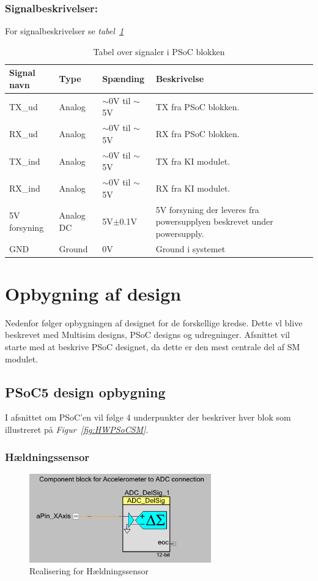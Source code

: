\subsubsection{Signalbeskrivelser:}
For signalbeskrivelser se \textit{tabel~\ref{table:UARTSignalerSM}}
\begin{table}[H]
\begin{tabular}{|p{3cm}|p{3cm}|p{3cm}|p{4.5cm}|} \hline
\cellcolor[gray]{0.85}Signal navn& \cellcolor[gray]{0.85}Type &\cellcolor[gray]{0.85}Spænding&\cellcolor[gray]{0.85}Beskrivelse\\ \hline
TX\_ud & Analog & $\sim$0V til $\sim$5V & TX fra PSoC blokken.\\ \hline
RX\_ud & Analog & $\sim$0V til $\sim$5V & RX fra PSoC blokken. \\ \hline
TX\_ind & Analog & $\sim$0V til $\sim$5V & TX fra KI modulet.\\ \hline
RX\_ind & Analog & $\sim$0V til $\sim$5V & RX fra KI modulet. \\ \hline
5V forsyning & Analog DC & 5V$\pm$0.1V & 5V forsyning der leveres fra powersupplyen beskrevet under powersupply.\\ \hline
GND & Ground & 0V & Ground i systemet \\ \hline
\end{tabular}
\caption{Tabel over signaler i PSoC blokken}
\label{table:UARTSignalerSM}
\end{table}

\section{Opbygning af design}
Nedenfor følger opbygningen af designet for de forskellige kredse. Dette vl blive beskrevet med Multisim designs, PSoC designs og udregninger. Afsnittet vil starte med at beskrive PSoC designet, da dette er den mest centrale del af SM modulet.
\subsection{PSoC5 design opbygning}
I afsnittet om PSoC'en vil følge 4 underpunkter der beskriver hver blok som illustreret på \textit{Figur~\ref{fig:HWPSoCSM}}.
\subsubsection{Hældningssensor}
\begin{figure}[H]
\centering
\includegraphics[width=0.7\textwidth]{billeder/levelsensor}
\caption{Realisering for Hældningssensor}
\label{fig:SMLEVEL}
\end{figure}

